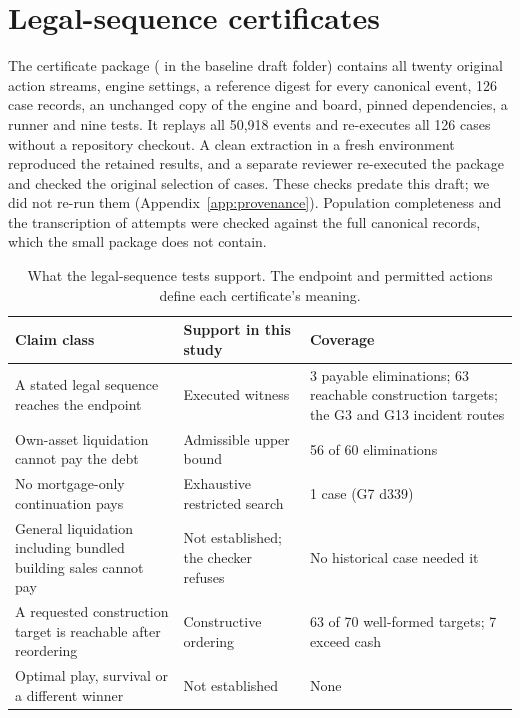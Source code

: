 \section{Legal-sequence certificates}
\label{app:certificates}

The certificate package ( in the baseline draft folder) contains all twenty original action streams, engine settings, a reference digest for every canonical event, 126 case records, an unchanged copy of the engine and board, pinned dependencies, a runner and nine tests. It replays all 50,918 events and re-executes all 126 cases without a repository checkout. A clean extraction in a fresh environment reproduced the retained results, and a separate reviewer re-executed the package and checked the original selection of cases. These checks predate this draft; we did not re-run them (Appendix~\ref{app:provenance}). Population completeness and the transcription of attempts were checked against the full canonical records, which the small package does not contain.

\begin{table}[htbp]
\centering\small
\begin{tabularx}{\linewidth}{@{}L{4.3cm}L{3.2cm}Y@{}}
\toprule
Claim class & Support in this study & Coverage\\
\midrule
A stated legal sequence reaches the endpoint & Executed witness & 3 payable eliminations; 63 reachable construction targets; the G3 and G13 incident routes\\
Own-asset liquidation cannot pay the debt & Admissible upper bound & 56 of 60 eliminations\\
No mortgage-only continuation pays & Exhaustive restricted search & 1 case (G7 d339)\\
General liquidation including bundled building sales cannot pay & Not established; the checker refuses & No historical case needed it\\
A requested construction target is reachable after reordering & Constructive ordering & 63 of 70 well-formed targets; 7 exceed cash\\
Optimal play, survival or a different winner & Not established & None\\
\bottomrule
\end{tabularx}
\caption{What the legal-sequence tests support. The endpoint and permitted actions define each certificate's meaning.}
\label{tab:support}
\end{table}

